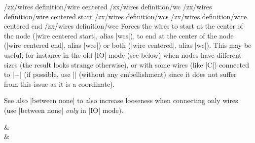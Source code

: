 \documentclass[a4paper]{ltxdoc}
\begin{document}
{\begin{pgfmanualentry}
  \makeatletter
  \def\extrakeytext{style, }
  \extractkey/zx/wires definition/wire centered\@nil%
  \extractkey/zx/wires definition/wc\@nil%
  \extractkey/zx/wires definition/wire centered start\@nil%
  \extractkey/zx/wires definition/wcs\@nil%
  \extractkey/zx/wires definition/wire centered end\@nil%
  \extractkey/zx/wires definition/wce\@nil%
  \makeatother
  \pgfmanualbody
  Forces the wires to start at the center of the node (|wire centered start|, alias |wcs|), to end at the center of the node (|wire centered end|, alias |wce|) or both (|wire centered|, alias |wc|). This may be useful, for instance in the old |IO| mode (see below) when nodes have different sizes (the result looks strange otherwise), or with some wires (like |C|) connected to |\ZxNone+| (if possible, use |\zxNone| (without any embellishment) since it does not suffer from this issue as it is a coordinate).

  See also |between none| to also increase looseness when connecting only wires (use |between none| \emph{only} in |IO| mode).
\begin{codeexample}[width=3cm]
\begin{ZX}
  \zxZ{} \ar[IO,o',r] \ar[IO,o.,r]       & \zxX{\alpha}\\
  \zxZ{} \ar[IO,o',r,wc] \ar[IO,o.,r,wc] & \zxX{\alpha}
\end{ZX}
\end{codeexample}
\end{pgfmanualentry}


}
\end{document}
